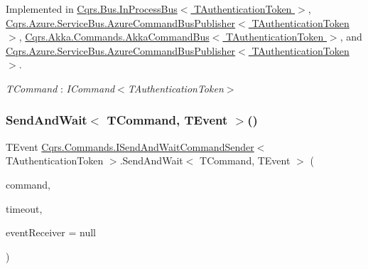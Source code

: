 Implemented in \hyperlink{classCqrs_1_1Bus_1_1InProcessBus_a1b3540fe06b60cd601eaff4ea53f5465}{Cqrs.\+Bus.\+In\+Process\+Bus$<$ T\+Authentication\+Token $>$}, \hyperlink{classCqrs_1_1Azure_1_1ServiceBus_1_1AzureCommandBusPublisher_ad6eaac86053e743a6e5265e23c4d5066}{Cqrs.\+Azure.\+Service\+Bus.\+Azure\+Command\+Bus\+Publisher$<$ T\+Authentication\+Token $>$}, \hyperlink{classCqrs_1_1Akka_1_1Commands_1_1AkkaCommandBus_a4f96fc98615afb9af8fe4d54a398660a}{Cqrs.\+Akka.\+Commands.\+Akka\+Command\+Bus$<$ T\+Authentication\+Token $>$}, and \hyperlink{classCqrs_1_1Azure_1_1ServiceBus_1_1AzureCommandBusPublisher_ad6eaac86053e743a6e5265e23c4d5066}{Cqrs.\+Azure.\+Service\+Bus.\+Azure\+Command\+Bus\+Publisher$<$ T\+Authentication\+Token $>$}.

\begin{Desc}
\item[Type Constraints]\begin{description}
\item[{\em T\+Command} : {\em I\+Command$<$T\+Authentication\+Token$>$}]\end{description}
\end{Desc}
\mbox{\label{interfaceCqrs_1_1Commands_1_1ISendAndWaitCommandSender_ada9643fbf8206bcc72cc5817f747ada8}} 
\subsubsection{\texorpdfstring{Send\+And\+Wait$<$ T\+Command, T\+Event $>$()}{SendAndWait< TCommand, TEvent >()}\hspace{0.1cm}{\footnotesize\ttfamily [3/6]}}
{\footnotesize\ttfamily T\+Event \hyperlink{interfaceCqrs_1_1Commands_1_1ISendAndWaitCommandSender}{Cqrs.\+Commands.\+I\+Send\+And\+Wait\+Command\+Sender}$<$ T\+Authentication\+Token $>$.Send\+And\+Wait$<$ T\+Command, T\+Event $>$ (\begin{DoxyParamCaption}\item[{T\+Command}]{command,  }\item[{Time\+Span}]{timeout,  }\item[{\hyperlink{interfaceCqrs_1_1Events_1_1IEventReceiver}{I\+Event\+Receiver}$<$ T\+Authentication\+Token $>$}]{event\+Receiver = {\ttfamily null} }\end{DoxyParamCaption})}



